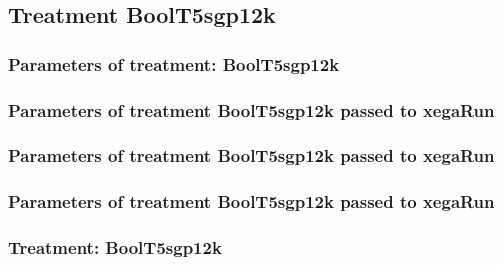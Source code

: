 \documentclass[18pt,c]{beamer}
\begin{document}
\clearpage
\subsection{Treatment BoolT5sgp12k}

 \begin{frame}
 \fontsize{8pt}{9pt}\selectfont
 \frametitle{  Parameters of treatment: BoolT5sgp12k 
 }

 \label{ExpFtParmTable008.tex}  
 \end{frame}


 \begin{frame}
 \fontsize{8pt}{9pt}\selectfont
 \frametitle{  Parameters of treatment BoolT5sgp12k passed to xegaRun
 }

 \label{ExpFtParmTable009.tex}  
 \end{frame}


 \begin{frame}
 \fontsize{8pt}{9pt}\selectfont
 \frametitle{  Parameters of treatment BoolT5sgp12k passed to xegaRun
 }

 \label{ExpFtParmTable010.tex}  
 \end{frame}


 \begin{frame}
 \fontsize{8pt}{9pt}\selectfont
 \frametitle{  Parameters of treatment BoolT5sgp12k passed to xegaRun
 }

 \label{ExpFtParmTable011.tex}  
 \end{frame}

 \begin{frame}
 \fontsize{8pt}{9pt}\selectfont
 \frametitle{ Treatment: BoolT5sgp12k }

 \label{ExpFStatsTable005.tex}  
 \end{frame}
\end{document}
